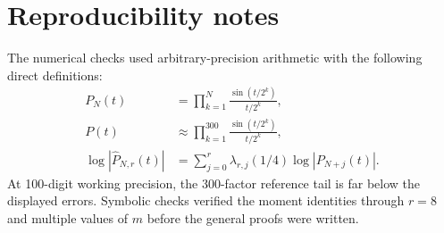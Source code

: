 \documentclass[11pt]{article}
\theoremstyle{definition}
\theoremstyle{remark}
\begin{document}
\section{Reproducibility notes}
\label{app:repro}

The numerical checks used arbitrary-precision arithmetic with the following direct definitions:
\begin{align*}
P_N(t)&=\prod_{k=1}^{N}\frac{\sin(t/2^k)}{t/2^k},\\
P(t)&\approx\prod_{k=1}^{300}\frac{\sin(t/2^k)}{t/2^k},\\
\log|\widehat P_{N,r}(t)|
&=\sum_{j=0}^{r}\lambda_{r,j}(1/4)\log|P_{N+j}(t)|.
\end{align*}
At 100-digit working precision, the 300-factor reference tail is far below the displayed errors. Symbolic checks verified the moment identities through $r=8$ and multiple values of $m$ before the general proofs were written.
\end{document}
